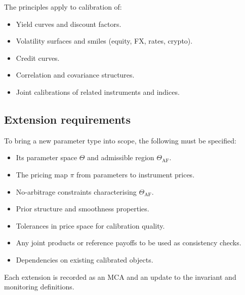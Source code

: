 \documentclass[11pt,a4paper]{article}
\begin{document}
The principles apply to calibration of:
\begin{itemize}
    \item Yield curves and discount factors.
    \item Volatility surfaces and smiles (equity, FX, rates, crypto).
    \item Credit curves.
    \item Correlation and covariance structures.
    \item Joint calibrations of related instruments and indices.
\end{itemize}

\subsection{Extension requirements}

To bring a new parameter type into scope, the following must be specified:
\begin{itemize}
    \item Its parameter space $\Theta$ and admissible region $\Theta_{\text{AF}}$.
    \item The pricing map $\pi$ from parameters to instrument prices.
    \item No-arbitrage constraints characterising $\Theta_{\text{AF}}$.
    \item Prior structure and smoothness properties.
    \item Tolerances in price space for calibration quality.
    \item Any joint products or reference payoffs to be used as consistency checks.
    \item Dependencies on existing calibrated objects.
\end{itemize}

Each extension is recorded as an MCA and an update to the invariant and monitoring definitions.
\end{document}
